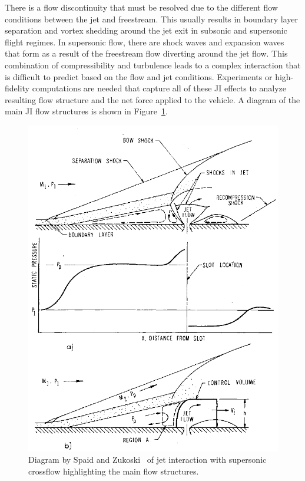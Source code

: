 \documentclass[12pt]{article}
\begin{document}
There is a flow discontinuity that must be resolved due to the different flow conditions between the jet and freestream. This usually results in boundary layer separation and vortex shedding around the jet exit in subsonic and supersonic flight regimes. In supersonic flow, there are shock waves and expansion waves that form as a result of the freestream flow diverting around the jet flow. This combination of compressibility and turbulence leads to a complex interaction that is difficult to predict based on the flow and jet conditions. Experiments or high-fidelity computations are needed that capture all of these JI effects to analyze resulting flow structure and the net force applied to the vehicle. A diagram of the main JI flow structures is shown in Figure~\ref{fig:spand1968}. %

\begin{figure}[H]
    \centering
    \includegraphics[width=0.9\linewidth]{figs/fig1spand1968.png}
    \caption{Diagram by Spaid and Zukoski~\cite{spaid1968study} of jet interaction with supersonic crossflow highlighting the main flow structures.}
    \label{fig:spand1968}
\end{figure}
\end{document}
